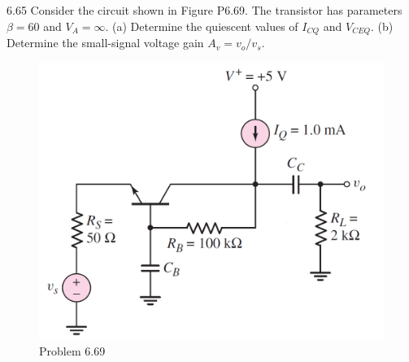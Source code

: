 \documentclass[a4paper,11pt,UTF8]{article}
\begin{document}
6.65 Consider the circuit shown in Figure P6.69. The transistor has parameters
$\beta = 60$ and $V_A =\infty$. (a) Determine the quiescent values of $I_{CQ}$ and $V_{CEQ}$.
(b) Determine the small-signal voltage gain $A_v = v_o/v_s$.
\begin{figure}[H] 
	\centering 
	\includegraphics[scale=0.3]{MD6.69.png}
	\caption{Problem 6.69}
\end{figure}
\end{document}
